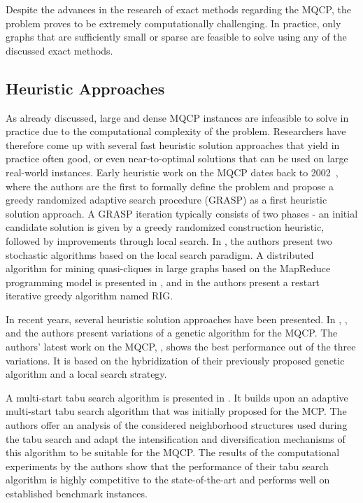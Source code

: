 \documentclass[draft,final]{vutinfth} %
\begin{document}
Despite the advances in the research of exact methods regarding the MQCP, the problem proves to be extremely computationally challenging. In practice, only graphs that are sufficiently small or sparse are feasible to solve using any of the discussed exact methods. 

\subsection{Heuristic Approaches}

As already discussed, large and dense MQCP instances are infeasible to solve in practice due to the computational complexity of the problem. Researchers have therefore come up with several fast heuristic solution approaches that yield in practice often good, or even near-to-optimal solutions that can be used on large real-world instances. 
Early heuristic work on the MQCP dates back to 2002~\cite{Abello2002}, where the authors are the first to formally define the problem and propose a greedy randomized adaptive search procedure (GRASP) as a first heuristic solution approach. A GRASP iteration typically consists of two phases - an initial candidate solution is given by a greedy randomized construction heuristic, followed by improvements through local search. In \cite{Brunato2008}, the authors present two stochastic algorithms based on the local search paradigm. A distributed algorithm for mining quasi-cliques in large graphs based on the MapReduce programming model is presented in \cite{Khosraviani2011}, and in \cite{oliveira2013construction} the authors present a restart iterative greedy algorithm named RIG. 

In recent years, several heuristic solution approaches have been presented. In \cite{pinto2015biased}, \cite{pinto_biased_2018}, and \cite{pinto2021brkga} the authors present variations of a genetic algorithm for the MQCP. The authors' latest work on the MQCP, \cite{pinto2021brkga}, shows the best performance out of the three variations. It is based on the hybridization of their previously proposed genetic algorithm and a local search strategy. 

A multi-start tabu search algorithm is presented in \cite{djeddi_extension_2019}. It builds upon an adaptive multi-start tabu search algorithm that was initially proposed for the MCP. The authors offer an analysis of the considered neighborhood structures used during the tabu search and adapt the intensification and diversification mechanisms of this algorithm to be suitable for the MQCP. The results of the computational experiments by the authors show that the performance of their tabu search algorithm is highly competitive to the state-of-the-art and performs well on established benchmark instances. 
\end{document}
